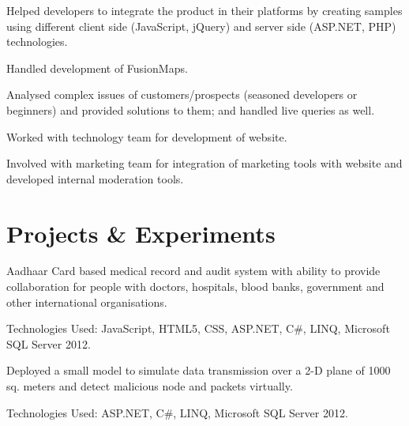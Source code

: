 \documentclass[]{gagan-resume}
\begin{document}
\begin{minipage}[t]{0.66\textwidth}
\begin{tightemize}
\item Helped developers to integrate the product in their platforms by creating samples using different client side (JavaScript, jQuery) and server side (ASP.NET, PHP) technologies.
\item Handled development of FusionMaps.
\item Analysed complex issues of customers/prospects (seasoned developers or beginners) and provided solutions to them; and handled live queries as well.
\end{tightemize}
\sectionsep

\begin{tightemize}
\item Worked with technology team for development of website.
\item Involved with marketing team for integration of marketing tools with website and developed internal moderation tools.
\end{tightemize}
\sectionsep



\section{Projects \& Experiments}
\begin{tightemize}
\item Aadhaar Card based medical record and audit system with ability to provide collaboration for people with doctors, hospitals, blood banks, government and other international organisations.
\item Technologies Used: JavaScript, HTML5, CSS, ASP.NET, C\#, LINQ, Microsoft SQL Server 2012.
\end{tightemize}
\sectionsep

\begin{tightemize}
\item Deployed a small model to simulate data transmission over a 2-D plane of 1000 sq. meters and detect malicious node and packets virtually.
\item Technologies Used: ASP.NET, C\#, LINQ, Microsoft SQL Server 2012.
\end{tightemize}
\sectionsep



\end{minipage} 
\end{document}
